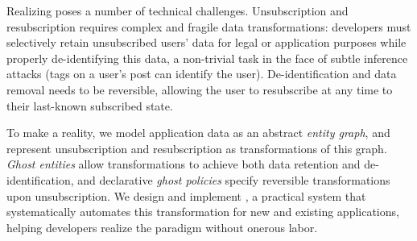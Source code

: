 Realizing \name poses a number of technical challenges.
Unsubscription and resubscription requires complex and fragile data transformations: developers must
selectively retain unsubscribed users' data for legal or application purposes while properly
de-identifying this data, a non-trivial task in the face of subtle inference attacks (\eg tags on a
user's post can identify the user). De-identification and data removal needs to be reversible,
allowing the user to resubscribe at any time to their last-known subscribed state.

To make \name a reality, we model application data as an abstract \emph{entity graph}, and
represent unsubscription and resubscription as transformations of this graph.
\emph{Ghost entities} allow transformations to achieve both data retention and de-identification,
and declarative \emph{ghost policies} specify reversible transformations upon unsubscription.
We design and implement \sys, a practical system that systematically automates this transformation for new and existing applications, helping developers realize the \name paradigm without onerous labor.
\fi
